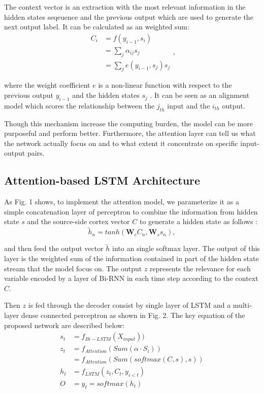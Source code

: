 \documentclass[journal]{IEEEtran}
\begin{document}
The context vector is an extraction with the most relevant information in the hidden states seqeuence and the previous output which are used to generate the next output label. It can be calculated as an weighted sum:
\begin{equation}
\begin{aligned}
C_i &= f(y_{i-1}, s_i)\\
&=\sum_j \alpha_{ij}s_j\\
&= \sum_j e(y_{i-1},s_j)s_j
\end{aligned},
\end{equation}

where the weight coefficient $e$ is a non-linear function with respect to the previous output $y_{i-1}$ and the hidden states $s_j$ \cite{bahdanau2014neural}. It can be seen as an alignment model which scores the relationship between the $j_{th}$ input and the $i_{th}$ output.

Though this mechanism increase the computing burden, the model can be more purposeful and perform better. Furthermore, the attention layer can tell us what the network actually focus on and to what extent it concentrate on specific input-output pairs.

\subsection{Attention-based LSTM Architecture}	
As Fig. 1 shows, to implement the attention model, we parameterize it as a simple concatenation layer of perceptron to combine the information from hidden state $s$ and the source-side cortex vector $C$ to generate a hidden state as follows \cite{luong2015effective}:
\begin{equation}
\tilde{h}_n = tanh(\textbf{W}_{c}C_n, \textbf{W}_{s}s_n),
\end{equation}

and then feed the output vector $\tilde{h}$ into an single softmax layer. The output of this layer is the weighted sum of the information contained in part of the hidden state stream that the model focus on. The output $z$  represents the relevance for each variable encoded by a layer of Bi-RNN in each time step according to the context $C$.

Then $z$ is fed through the decoder consist by single layer of LSTM and a multi-layer dense connected perceptron as shown in Fig. 2. The key equation of the proposed network are described below:
\[
\begin{aligned}
s_t &= f_{Bi-LSTM}(X_{input}))\\
z_t & = f_{Attention} ( Sum (\alpha \cdot S_i))\\
& = f_{Attention}(Sum (softmax(C, s), s))\\
h_t &= f_{LSTM} (z_t, C_t, y_{i<t})\\
O &= y_t = softmax(h_t)
\end{aligned}
\]
\end{document}
